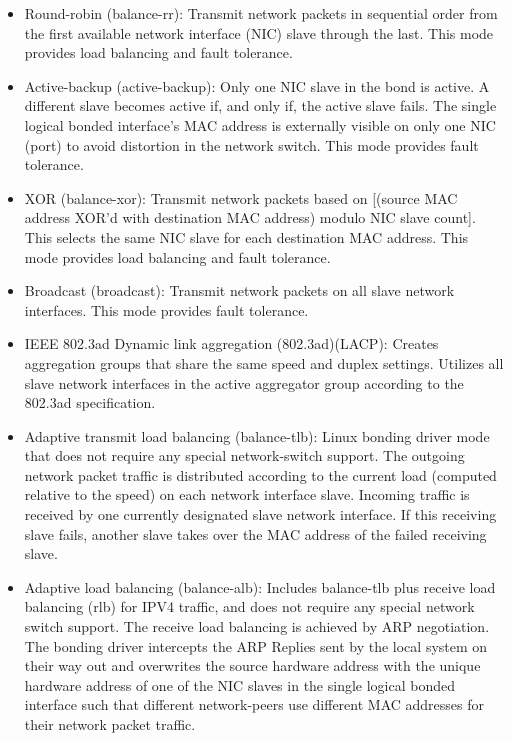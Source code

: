 \begin{itemize}[leftmargin=2cm]

	\item Round-robin (balance-rr): Transmit network packets in sequential order from the first available network interface (NIC) slave through the last. This mode provides load balancing and fault tolerance.

	\item Active-backup (active-backup): Only one NIC slave in the bond is active. A different slave becomes active if, and only if, the active slave fails. The single logical bonded interface’s MAC address is externally visible on only one NIC (port) to avoid distortion in the network switch. This mode provides fault tolerance.

	\item XOR (balance-xor): Transmit network packets based on [(source MAC address XOR’d with destination MAC address) modulo NIC slave count]. This selects the same NIC slave for each destination MAC address. This mode provides load balancing and fault tolerance.

	\item Broadcast (broadcast): Transmit network packets on all slave network interfaces. This mode provides fault tolerance.

	\item IEEE 802.3ad Dynamic link aggregation (802.3ad)(LACP): Creates aggregation groups that share the same speed and duplex settings. Utilizes all slave network interfaces in the active aggregator group according to the 802.3ad specification.

	\item Adaptive transmit load balancing (balance-tlb): Linux bonding driver mode that does not require any special network-switch support. The outgoing network packet traffic is distributed according to the current load (computed relative to the speed) on each network interface slave. Incoming traffic is received by one currently designated slave network interface. If this receiving slave fails, another slave takes over the MAC address of the failed receiving slave.

	\item Adaptive load balancing (balance-alb): Includes balance-tlb plus receive load balancing (rlb) for IPV4 traffic, and does not require any special network switch support. The receive load balancing is achieved by ARP negotiation. The bonding driver intercepts the ARP Replies sent by the local system on their way out and overwrites the source hardware address with the unique hardware address of one of the NIC slaves in the single logical bonded interface such that different network-peers use different MAC addresses for their network packet traffic.

\end{itemize}

